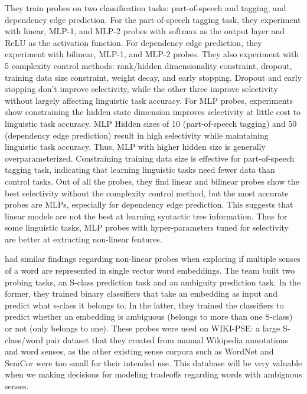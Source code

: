 \documentclass[11pt,a4paper]{article}
\begin{document}
They train probes on two classification tasks: part-of-speech and tagging, and dependency edge prediction. For the part-of-speech tagging task, they experiment with linear, MLP-1, and MLP-2 probes with softmax as the output layer and ReLU as the activation function. For dependency edge prediction, they experiment with bilinear, MLP-1, and MLP-2 probes. They also experiment with 5 complexity control methods: rank/hidden dimensionality constraint, dropout, training data size constraint, weight decay, and early stopping. Dropout and early stopping don't improve selectivity, while the other three improve selectivity without largely affecting linguistic task accuracy. For MLP probes, experiments show constraining the hidden state dimension improves selectivity at little cost to linguistic task accuracy. MLP Hidden sizes of 10 (part-of-speech tagging) and 50 (dependency edge prediction) result in high selectivity while maintaining linguistic task accuracy. Thus, MLP with higher hidden size is generally overparameterized. Constraining training data size is effective for part-of-speech tagging task, indicating that learning linguistic tasks need fewer data than control tasks. Out of all the probes, they find linear and bilinear probes show the best selectivity without the complexity control method, but the most accurate probes are MLPs, especially for dependency edge prediction. This suggests that linear models are not the best at learning syntactic tree information. Thus for some linguistic tasks, MLP probes with hyper-parameters tuned for selectivity are better at extracting non-linear features.

\cite{yaghoob2019probing} had similar findings regarding non-linear probes when exploring if multiple senses of a word are represented in single vector word embeddings. The team built two probing tasks, an S-class prediction task and an ambiguity prediction task. In the former, they trained binary classifiers that take an embedding as input and predict what s-class it belongs to. In the latter, they trained the classifiers to predict whether an embedding is ambiguous (belongs to more than one S-class) or not (only belongs to one). These probes were used on WIKI-PSE: a large S-class/word pair dataset that they created from manual Wikipedia annotations and word senses, as the other existing sense corpora such as WordNet and SemCor were too small for their intended use. This database will be very valuable when we making decisions for modeling tradeoffs regarding words with ambiguous senses.
    
\end{document}
